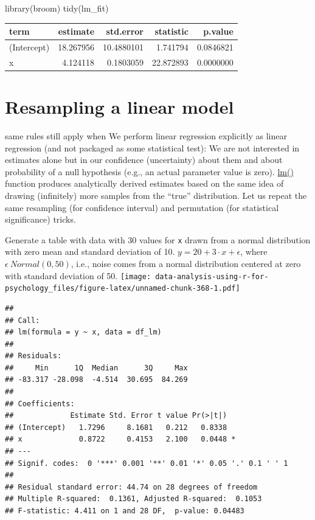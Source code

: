 \documentclass[
]{book}
\newenvironment{Shaded}{\begin{snugshade}}{\end{snugshade}}
\newcommand{\FunctionTok}[1]{\textcolor[rgb]{0.00,0.00,0.00}{#1}}
\newcommand{\NormalTok}[1]{#1}
\begin{document}
\begin{Shaded}
\begin{Highlighting}[]
\FunctionTok{library}\NormalTok{(broom)}
\FunctionTok{tidy}\NormalTok{(lm\_fit)}
\end{Highlighting}
\end{Shaded}

\begin{tabular}{l|r|r|r|r}
\hline
term & estimate & std.error & statistic & p.value\\
\hline
(Intercept) & 18.267956 & 10.4880101 & 1.741794 & 0.0846821\\
\hline
x & 4.124118 & 0.1803059 & 22.872893 & 0.0000000\\
\hline
\end{tabular}

\hypertarget{resampling-a-linear-model}{%
\section{Resampling a linear model}\label{resampling-a-linear-model}}

same rules still apply when We perform linear regression explicitly as linear regression (and not packaged as some statistical test): We are not interested in estimates alone but in our confidence (uncertainty) about them and about probability of a null hypothesis (e.g., an actual parameter value is zero). \href{https://stat.ethz.ch/R-manual/R-devel/library/stats/html/lm.html}{lm()} function produces analytically derived estimates based on the same idea of drawing (infinitely) more samples from the ``true'' distribution. Let us repeat the same resampling (for confidence interval) and permutation (for statistical significance) tricks.

Generate a table with data with 30 values for \texttt{x} drawn from a normal distribution with zero mean and standard deviation of 10. \(y = 20 +3 \cdot x + \epsilon\), where \(\epsilon ~ Normal(0, 50)\), i.e., noise comes from a normal distribution centered at zero with standard deviation of 50.
\texttt{[image: data-analysis-using-r-for-psychology\_files/figure-latex/unnamed-chunk-368-1.pdf]}

\begin{verbatim}
## 
## Call:
## lm(formula = y ~ x, data = df_lm)
## 
## Residuals:
##     Min      1Q  Median      3Q     Max 
## -83.317 -28.098  -4.514  30.695  84.269 
## 
## Coefficients:
##             Estimate Std. Error t value Pr(>|t|)  
## (Intercept)   1.7296     8.1681   0.212   0.8338  
## x             0.8722     0.4153   2.100   0.0448 *
## ---
## Signif. codes:  0 '***' 0.001 '**' 0.01 '*' 0.05 '.' 0.1 ' ' 1
## 
## Residual standard error: 44.74 on 28 degrees of freedom
## Multiple R-squared:  0.1361, Adjusted R-squared:  0.1053 
## F-statistic: 4.411 on 1 and 28 DF,  p-value: 0.04483
\end{verbatim}
\end{document}
